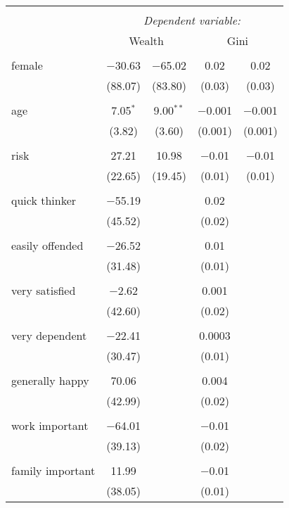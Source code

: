 \documentclass[11pt,]{article}
\begin{document}
\begin{table}[!htbp] \centering 
  \caption{} 
  \label{} 
\begin{tabular}{@{\extracolsep{5pt}}lcccc} 
\\[-1.8ex]\hline 
\hline \\[-1.8ex] 
 & \multicolumn{4}{c}{\textit{Dependent variable:}} \\ 
\cline{2-5} 
 & \multicolumn{2}{c}{Wealth} & \multicolumn{2}{c}{Gini} \\ 
\hline \\[-1.8ex] 
 female & $-$30.63 & $-$65.02 & 0.02 & 0.02 \\ 
  & (88.07) & (83.80) & (0.03) & (0.03) \\ 
  & & & & \\ 
 age & 7.05$^{*}$ & 9.00$^{**}$ & $-$0.001 & $-$0.001 \\ 
  & (3.82) & (3.60) & (0.001) & (0.001) \\ 
  & & & & \\ 
 risk & 27.21 & 10.98 & $-$0.01 & $-$0.01 \\ 
  & (22.65) & (19.45) & (0.01) & (0.01) \\ 
  & & & & \\ 
 quick thinker & $-$55.19 &  & 0.02 &  \\ 
  & (45.52) &  & (0.02) &  \\ 
  & & & & \\ 
 easily offended & $-$26.52 &  & 0.01 &  \\ 
  & (31.48) &  & (0.01) &  \\ 
  & & & & \\ 
 very satisfied & $-$2.62 &  & 0.001 &  \\ 
  & (42.60) &  & (0.02) &  \\ 
  & & & & \\ 
 very dependent & $-$22.41 &  & 0.0003 &  \\ 
  & (30.47) &  & (0.01) &  \\ 
  & & & & \\ 
 generally happy & 70.06 &  & 0.004 &  \\ 
  & (42.99) &  & (0.02) &  \\ 
  & & & & \\ 
 work important & $-$64.01 &  & $-$0.01 &  \\ 
  & (39.13) &  & (0.02) &  \\ 
  & & & & \\ 
 family important & 11.99 &  & $-$0.01 &  \\ 
  & (38.05) &  & (0.01) &  \\ 

\end{tabular}
\end{table}
\end{document}
